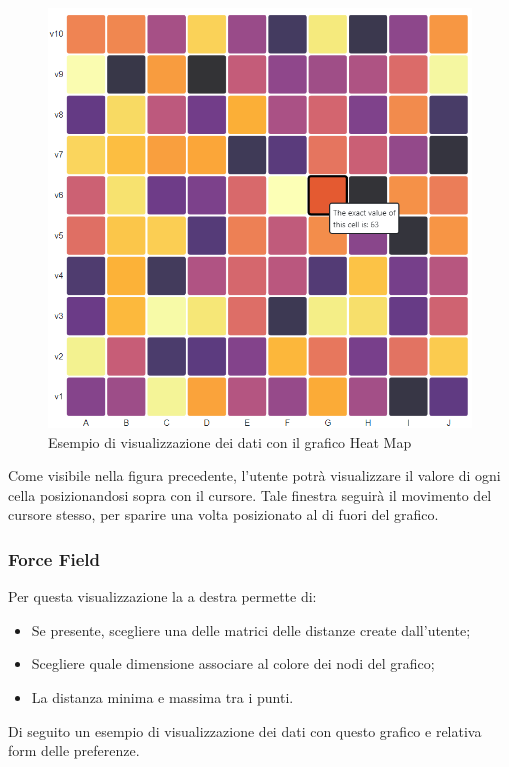 \begin{figure}[H]
		\includegraphics[scale=0.4]{Images/hmb.png}
		\centering
		\caption{Esempio di visualizzazione dei dati con il grafico Heat Map}
\end{figure}

Come visibile nella figura precedente, l'utente potrà visualizzare il valore di ogni cella posizionandosi sopra con il cursore. Tale finestra seguirà il movimento del cursore stesso, per sparire una volta posizionato al di fuori del grafico.

\newpage

\subsubsection{Force Field}

Per questa visualizzazione la  a destra permette di:
\begin{itemize}
	\item Se presente, scegliere una delle matrici delle distanze create dall'utente;
	\item Scegliere quale dimensione associare al colore dei nodi del grafico;
	\item La distanza minima e massima tra i punti.
\end{itemize} 
Di seguito un esempio di visualizzazione dei dati con questo grafico e relativa form delle preferenze.

